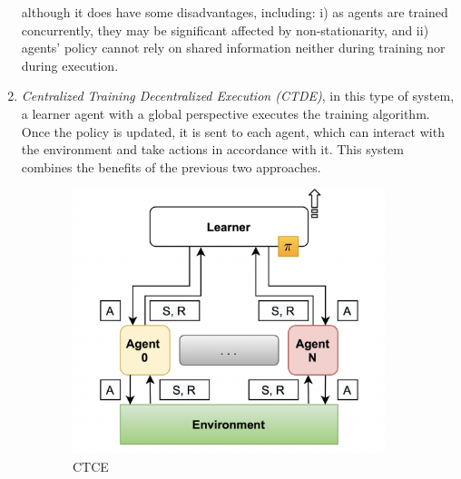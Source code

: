 \documentclass[12pt,a4paper,openright,twoside]{book}
\begin{document}
\begin{enumerate}
            although it does have some disadvantages, including: 
            i) as agents are trained concurrently, they may be significant affected by non-stationarity, and
            ii) agents' policy cannot rely on shared information neither during training nor during execution.
        \item \emph{Centralized Training Decentralized Execution (CTDE)}, in this type of system, a learner agent with a global perspective
            executes the training algorithm. Once the policy is updated, it is sent to each agent, which can interact with the environment 
            and take actions in accordance with it. This system combines the benefits of the previous two approaches.
    \end{enumerate}

\begin{figure}[t]
    \begin{subfigure}[b]{0.32\textwidth}
        \centering
        \includegraphics[width=\textwidth]{figures/CTCE.png}
        \caption{CTCE}
        \label{fig:ctce}
    \end{subfigure}
    \begin{subfigure}[b]{0.32\textwidth}
        \centering

\end{subfigure}
\end{figure}
\end{document}
